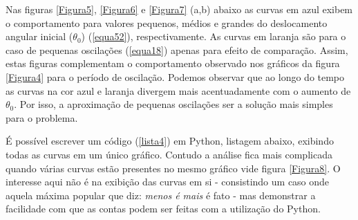 \documentclass[12pt,openright,twoside,english,brazil]{abntex2}
\begin{document}


Nas figuras \ref{Figura5}, \ref{Figura6} e \ref{Figura7} (a,b) abaixo as curvas em azul exibem o comportamento para valores pequenos, médios e grandes do deslocamento angular inicial ($\theta_0$) (\ref{equa52}), respectivamente. As curvas em laranja são para o caso de pequenas oscilações (\ref{equa18}) apenas para efeito de comparação. Assim, estas figuras complementam o comportamento observado nos gráficos da figura \ref{Figura4} para o período de oscilação. Podemos observar que ao longo do tempo as curvas na cor azul e laranja divergem mais acentuadamente com o aumento de $\theta_0$. Por isso, a aproximação de pequenas oscilações ser a solução mais simples para o problema.



É possível escrever um código (\ref{lista4}) em Python, listagem abaixo, exibindo todas as curvas em um único gráfico. Contudo a análise fica mais complicada quando várias curvas estão presentes no mesmo gráfico vide figura \ref{Figura8}. O interesse aqui não é na exibição das curvas em si - consistindo um caso onde aquela máxima popular que diz: \textit{menos é mais} é fato - mas demonstrar a facilidade com que as contas podem ser feitas com a utilização do Python.
\vspace{1.0cm}
\end{document}
